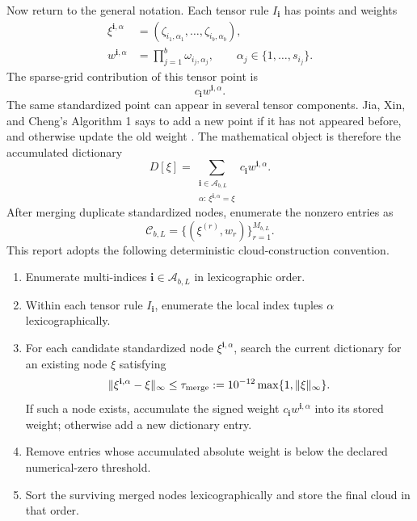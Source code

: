 \documentclass[11pt]{article}
\numberwithin{equation}{section}
\begin{document}
Now return to the general notation.  Each tensor rule \(I_{\mathbf i}\) has
points and weights
\begin{align}
  \xi^{\mathbf i,\alpha}
  &=
  (\zeta_{i_1,\alpha_1},\ldots,\zeta_{i_b,\alpha_b}),
  \label{eq:p32-smolyak-node}\\
  w^{\mathbf i,\alpha}
  &=
  \prod_{j=1}^b \omega_{i_j,\alpha_j},
  \qquad
  \alpha_j\in\{1,\ldots,s_{i_j}\}.
  \label{eq:p32-smolyak-tensor-weight}
\end{align}
The sparse-grid contribution of this tensor point is
\begin{equation}
  c_{\mathbf i}w^{\mathbf i,\alpha}.
  \label{eq:p32-smolyak-point-contribution}
\end{equation}
The same standardized point can appear in several tensor components.  Jia,
Xin, and Cheng's Algorithm 1 says to add a new point if it has not appeared
before, and otherwise update the old weight \cite[Algorithm 1]{jia2012sparsegrid}.
The mathematical object is therefore the accumulated dictionary
\begin{equation}
  D[\xi]
  =
  \sum_{\substack{\mathbf i\in\mathcal A_{b,L}\\
  \alpha:\,\xi^{\mathbf i,\alpha}=\xi}}
  c_{\mathbf i}w^{\mathbf i,\alpha}.
  \label{eq:p31-node-dictionary}
\end{equation}
After merging duplicate standardized nodes, enumerate the nonzero entries as
\begin{equation}
  \mathcal C_{b,L}
  =
  \{(\xi^{(r)},w_r)\}_{r=1}^{M_{b,L}}.
  \label{eq:p31-fixed-cloud}
\end{equation}
This report adopts the following deterministic cloud-construction convention.

\begin{enumerate}[leftmargin=0.28in]
  \item Enumerate multi-indices \(\mathbf i\in\mathcal A_{b,L}\) in
  lexicographic order.
  \item Within each tensor rule \(I_{\mathbf i}\), enumerate the local index
  tuples \(\alpha\) lexicographically.
  \item For each candidate standardized node
  \(\xi^{\mathbf i,\alpha}\), search the current dictionary for an existing
  node \(\xi\) satisfying
  \begin{equation}
    \|\xi^{\mathbf i,\alpha}-\xi\|_\infty
    \le
    \tau_{\rm merge}
    :=10^{-12}\max\{1,\|\xi\|_\infty\}.
    \label{eq:p32-merge-rule}
  \end{equation}
  If such a node exists, accumulate the signed weight
  \(c_{\mathbf i}w^{\mathbf i,\alpha}\) into its stored weight; otherwise add a
  new dictionary entry.
  \item Remove entries whose accumulated absolute weight is below the declared
  numerical-zero threshold.
  \item Sort the surviving merged nodes lexicographically and store the final
  cloud in that order.
\end{enumerate}
\end{document}
